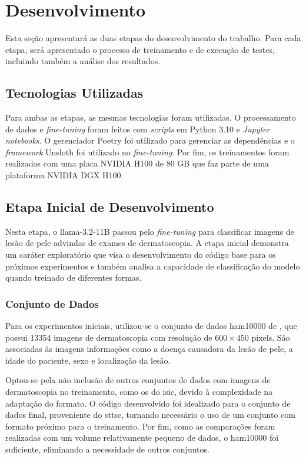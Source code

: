 \section{Desenvolvimento}

Esta seção apresentará as duas etapas do desenvolvimento do trabalho. Para cada etapa, será apresentado o processo de
treinamento e de execução de testes, incluindo também a análise dos resultados.

\subsection{Tecnologias Utilizadas}

Para ambas as etapas, as mesmas tecnologias foram utilizadas. O processamento de dados e \textit{fine-tuning} foram
feitos com \textit{scripts} em Python 3.10 e \textit{Jupyter notebooks}. O gerenciador Poetry foi utilizado para
gerenciar as dependências e o \textit{framework} Unsloth foi utilizado no \textit{fine-tuning}. Por fim, os
treinamentos foram realizados com uma placa NVIDIA H100 de 80 GB que faz parte de uma plataforma NVIDIA DGX H100.

\subsection{Etapa Inicial de Desenvolvimento}

Nesta etapa, o \ac{llama}-3.2-11B passou pelo \textit{fine-tuning} para classificar imagens de lesão de pele advindas
de exames de dermatoscopia. A etapa inicial demonstra um caráter exploratório que visa o desenvolvimento do código base
para os próximos experimentos e também analisa a capacidade de classificação do modelo quando treinado de diferentes
formas.

\subsubsection{Conjunto de Dados}

Para os experimentos iniciais, utilizou-se o conjunto de dados \ac{ham10000} de \textcite{tschandl2018ham10000}, que
possui 13354 imagens de dermatoscopia com resolução de \begin{math}600 \times 450\end{math} pixels. São associadas às
imagens informações como a doença causadora da lesão de pele, a idade do paciente, sexo e localização da lesão.

Optou-se pela não inclusão de outros conjuntos de dados com imagens de dermatoscopia no treinamento, como os do
\ac{isic}, devido à complexidade na adaptação do formato. O código desenvolvido foi idealizado para o conjunto de dados
final, proveniente do \ac{sttsc}, tornando necessário o uso de um conjunto com formato próximo para o treinamento. Por
fim, como as comparações foram realizadas com um volume relativamente pequeno de dados, o \ac{ham10000} foi suficiente,
eliminando a necessidade de outros conjuntos.

